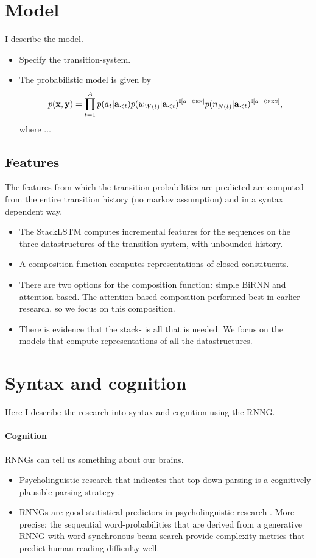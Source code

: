 % 

\section{Model}
I describe the model.
\begin{itemize}
  \item Specify the transition-system.
  \item The probabilistic model is given by
  \begin{equation}
    p(\mathbf{x}, \mathbf{y}) = \prod_{t=1}^A p(a_t | \mathbf{a}_{<t}) p(w_{W(t)} | \mathbf{a}_{<t} )^{ \mathbb{I}[a = \textsc{gen}] } p(n_{N(t)} | \mathbf{a}_{<t} )^{ \mathbb{I}[a = \textsc{open}] },
  \end{equation}
  where $\dots$
\end{itemize}

\subsection{Features}
The features from which the transition probabilities are predicted are computed from the entire transition history (no markov assumption) and in a syntax dependent way.
\begin{itemize}
  \item The StackLSTM computes incremental features for the sequences on the three datastructures of the transition-system, with unbounded history.
  \item A composition function computes representations of closed constituents.
  \item There are two options for the composition function: simple BiRNN and attention-based. The attention-based composition performed best in earlier research, so we focus on this composition.
  \item There is evidence that the stack- is all that is needed. We focus on the models that compute representations of all the datastructures.
\end{itemize}

\section{Syntax and cognition}
Here I describe the research into syntax and cognition using the RNNG.

\paragraph{Cognition} RNNGs can tell us something about our brains.
\begin{itemize}
  \item Psycholinguistic research that indicates that top-down parsing is a cognitively plausible parsing strategy \citep{Brennan+2016}.
  \item RNNGs are good statistical predictors in psycholinguistic research \citep{Hale+2018:beam}. More precise: the sequential word-probabilities that are derived from a generative RNNG with word-synchronous beam-search \citep{Stern+2017:beam} provide complexity metrics that predict human reading difficulty well.
\end{itemize}

